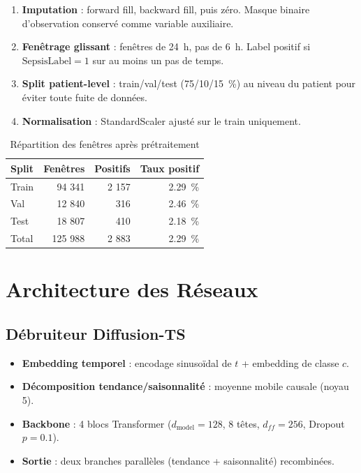 \documentclass[11pt,a4paper]{article}
\begin{document}
\begin{enumerate}
    \item \textbf{Imputation} : forward fill, backward fill, puis zéro. Masque binaire
    d'observation conservé comme variable auxiliaire.
    \item \textbf{Fenêtrage glissant} : fenêtres de 24~h, pas de 6~h. Label positif si
    $\text{SepsisLabel}=1$ sur au moins un pas de temps.
    \item \textbf{Split patient-level} : train/val/test (75/10/15~\%) au niveau du patient
    pour éviter toute fuite de données.
    \item \textbf{Normalisation} : StandardScaler ajusté sur le train uniquement.
\end{enumerate}

\begin{table}[H]
\centering
\caption{Répartition des fenêtres après prétraitement}
\begin{tabular}{lrrr}
\toprule
\textbf{Split} & \textbf{Fenêtres} & \textbf{Positifs} & \textbf{Taux positif} \\
\midrule
Train & 94 341 & 2 157 & 2.29~\% \\
Val   & 12 840 &   316 & 2.46~\% \\
Test  & 18 807 &   410 & 2.18~\% \\
\midrule
Total & 125 988 & 2 883 & 2.29~\% \\
\bottomrule
\end{tabular}
\end{table}


\section{Architecture des Réseaux}

\subsection{Débruiteur Diffusion-TS}

\begin{itemize}
    \item \textbf{Embedding temporel} : encodage sinusoïdal de $t$ + embedding de classe $c$.
    \item \textbf{Décomposition tendance/saisonnalité} : moyenne mobile causale (noyau 5).
    \item \textbf{Backbone} : 4 blocs Transformer ($d_\text{model}=128$, 8 têtes, $d_{ff}=256$, Dropout $p=0.1$).
    \item \textbf{Sortie} : deux branches parallèles (tendance + saisonnalité) recombinées.
\end{itemize}
\end{document}
